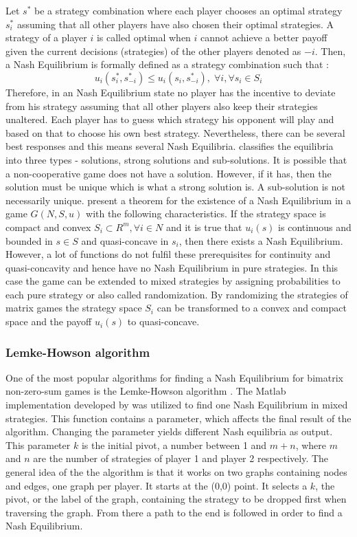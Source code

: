 {Let $s^*$ be a strategy combination where each player chooses an optimal strategy $s_i^*$ assuming that all other players have also chosen their optimal strategies. A strategy of a player $i$ is called optimal when $i$ cannot achieve a better payoff given the current decisions (strategies) of the other players denoted as $-i$. Then, a Nash Equilibrium is formally defined as a strategy combination such that \citep{holler2006einfuhrung}:
\begin{equation}
u_i(s_i^*, s_{-i}^*) \leq u_i(s_i,s_{-i}^*), \; \forall i, \forall s_i \in S_i
\end{equation}
Therefore, in an Nash Equilibrium state no player has the incentive to deviate from his strategy assuming that all other players also keep their strategies unaltered. Each player has to guess which strategy his opponent will play and based on that to choose his own best strategy. Nevertheless, there can be several best responses and this means several Nash Equilibria. \citet{nash1950equilibrium} classifies the equilibria into three types - solutions, strong solutions and sub-solutions. It is possible that a non-cooperative game does not have a solution. However, if it has, then the solution must be unique which is what a strong solution is. A sub-solution is not necessarily unique. \citet{holler2006einfuhrung} present a theorem for the existence of a Nash Equilibrium in a game $G(N,S,u)$ with the following characteristics. If the strategy space is compact and convex $S_i \subset R^m, \forall i \in N$ and it is true that $u_i(s)$ is continuous and bounded in $s \in S$ and quasi-concave in $s_i$, then there exists a Nash Equilibrium. However, a lot of functions do not fulfil these prerequisites for continuity and quasi-concavity and hence have no Nash Equilibrium in pure strategies. In this case the game can be extended to mixed strategies by assigning probabilities to each pure strategy or also called randomization. By randomizing the strategies of matrix games the strategy space $S_i$ can be transformed to a convex and compact space and the payoff $u_i(s)$ to quasi-concave.  

\subsubsection{Lemke-Howson algorithm}
\label{subsubsec:lemkehowson}
One of the most popular algorithms for finding a Nash Equilibrium for bimatrix non-zero-sum games is the Lemke-Howson algorithm \citep{lemke1964equilibrium}. The Matlab implementation developed by \citet{lemkeHowson2014Matlab} was utilized to find one Nash Equilibrium in mixed strategies. This function contains a parameter, which affects the final result of the algorithm. Changing the parameter yields different Nash equilibria as output. This parameter $k$ is the initial pivot, a number between 1 and $m+n$, where $m$ and $n$ are the number of strategies of player 1 and player 2 respectively. The general idea of the the algorithm is that it works on two graphs containing nodes and edges, one graph per player. It starts at the (0,0) point. It selects a $k$, the pivot, or the label of the graph, containing the strategy to be dropped first when traversing the graph. From there a path to the end is followed in order to find a Nash Equilibrium. 

}
